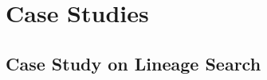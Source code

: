 \documentclass{opendatalab}
\begin{document}
\section{Case Studies}
\label{app:case-studies}





\subsection{Case Study on Lineage Search}
\label{app:case-study-search-resnet}
\end{document}
